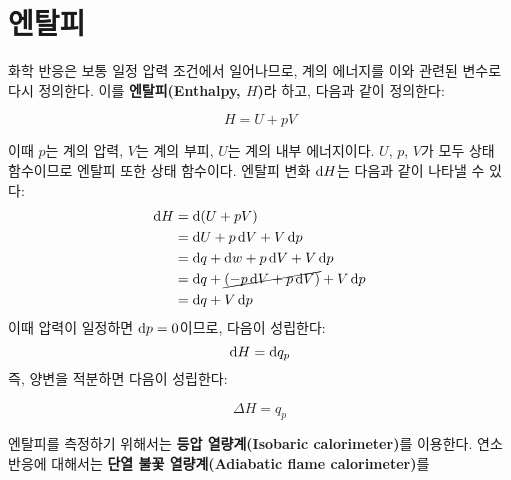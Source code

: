    \section{엔탈피}\label{enthal}
            \hspace{\parindent} 화학 반응은 보통 일정 압력 조건에서 일어나므로, 계의 에너지를 이와 관련된 변수로 다시 정의한다. 이를 \textbf{엔탈피(Enthalpy, $H$)}라 하고, 
            다음과 같이 정의한다:
            \begin{defn}[엔탈피]
                \begin{equation*}
                    H = U + pV
                \end{equation*}
            \end{defn}
            이때 $p$는 계의 압력, $V$는 계의 부피, $U$는 계의 내부 에너지이다. $U$, $p$, $V$가 모두 상태 함수이므로 엔탈피 또한 상태 함수이다. 엔탈피 변화 $\operatorname{d\!} H$는 
            다음과 같이 나타낼 수 있다:
                \begin{equation*}
                    \begin{aligned}
                        \difform H &= \difform \left(U+pV\right)\\
                        &= \difform U + p \difform V + V \difform p\\
                        &= \difform q + \difform w + p \difform V + V \difform p\\
                        &= \difform q + \cancel{\left(-p \difform V + p \difform V\right)} + V \difform p\\
                        &= \difform q + V \difform p
                    \end{aligned}
                \end{equation*}
            이때 압력이 일정하면 $\operatorname{d\!} p = 0$이므로, 다음이 성립한다:
                \begin{equation*}
                    \operatorname{d\!} H = \operatorname{d\!} q_p
                \end{equation*}
            즉, 양변을 적분하면 다음이 성립한다:
            \begin{obs}
                \begin{equation*}
                    \Delta H = q_p
                \end{equation*}
            \end{obs}
            \par 엔탈피를 측정하기 위해서는 \textbf{등압 열량계(Isobaric calorimeter)}를 이용한다. 연소 반응에 대해서는 \textbf{단열 불꽃 열량계(Adiabatic flame calorimeter)}를 
